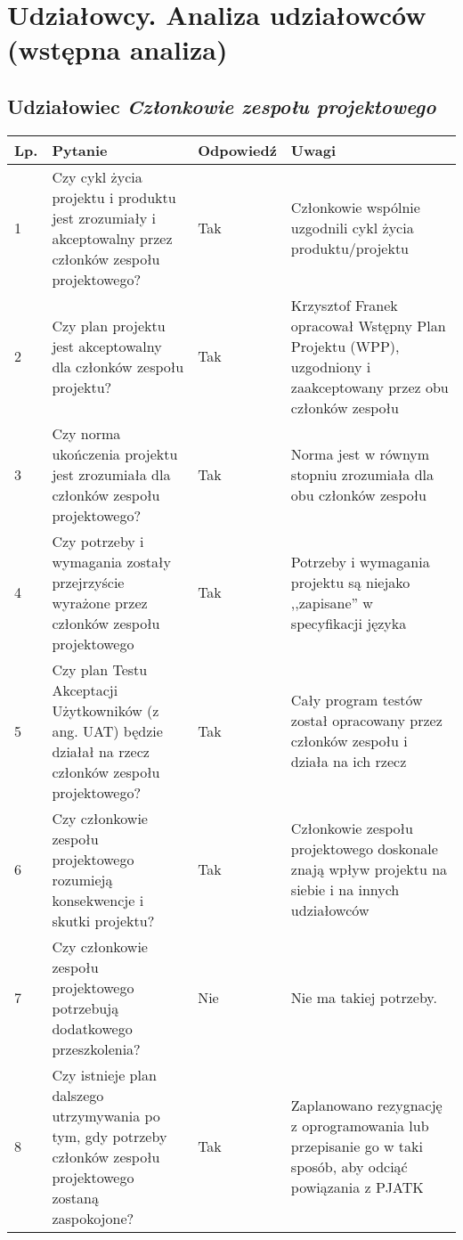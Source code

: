 \documentclass[11pt,oneside,a4paper,titlepage,onecolumn]{article}
\begin{document}
\section{Udziałowcy. Analiza udziałowców (wstępna analiza)}

\subsection{Udziałowiec \textit{Członkowie zespołu projektowego}}

\begin{tabularx}{\textwidth}{|l|X|l|X|}
	\hline
	
	\hline
    Lp. & Pytanie & Odpowiedź & Uwagi \\ \hline
    
    1
    & Czy cykl życia projektu i produktu jest zrozumiały i
    akceptowalny przez członków zespołu projektowego?
    & Tak
    & Członkowie wspólnie uzgodnili cykl życia produktu/projektu
    \\\hline
    
    2
    & Czy plan projektu jest akceptowalny dla członków zespołu
    projektu?
    & Tak
    & Krzysztof Franek opracował Wstępny Plan Projektu (WPP), 
    uzgodniony i zaakceptowany przez obu członków zespołu
    \\\hline
    
    3
    & Czy norma ukończenia projektu jest zrozumiała dla członków
    zespołu projektowego?
    & Tak
    & Norma jest w równym stopniu zrozumiała dla obu członków zespołu
    \\\hline
    
    4
    & Czy potrzeby i wymagania zostały przejrzyście wyrażone
    przez członków zespołu projektowego
    & Tak
    & Potrzeby i wymagania projektu są niejako ,,zapisane'' w
    specyfikacji języka
    \\\hline
    
    5
    & Czy plan Testu Akceptacji Użytkowników (z ang. UAT) będzie
    działał na rzecz członków zespołu projektowego?
    & Tak
    & Cały program testów został opracowany przez członków zespołu
    i działa na ich rzecz
    \\\hline
    
    6
    & Czy członkowie zespołu projektowego rozumieją konsekwencje i
    skutki projektu?
    & Tak
    & Członkowie zespołu projektowego doskonale znają wpływ projektu
    na siebie i na innych udziałowców
    \\\hline
    
    7
    & Czy członkowie zespołu projektowego potrzebują dodatkowego
    przeszkolenia?
    & Nie
    & Nie ma takiej potrzeby.
    \\\hline
    
    8
    & Czy istnieje plan dalszego utrzymywania po tym, gdy
    potrzeby członków zespołu projektowego zostaną zaspokojone?
    & Tak
    & Zaplanowano rezygnację z oprogramowania lub przepisanie go 
    w taki sposób, aby odciąć powiązania z PJATK
    \\\hline
    
\end{tabularx}
\end{document}
